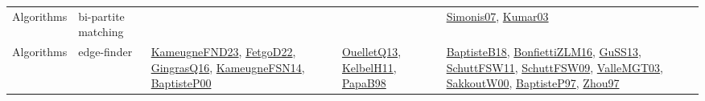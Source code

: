 {\begin{longtable}{lp{3cm}>{\raggedright}p{6cm}>{\raggedright}p{6cm}p{8cm}}
Algorithms & bi-partite matching &  &  & \href{articles/Simonis07.pdf}{Simonis07}\cite{Simonis07}, \href{papers/Kumar03.pdf}{Kumar03}\cite{Kumar03}\\
Algorithms & edge-finder & \href{papers/KameugneFND23.pdf}{KameugneFND23}\cite{KameugneFND23}, \href{articles/FetgoD22.pdf}{FetgoD22}\cite{FetgoD22}, \href{papers/GingrasQ16.pdf}{GingrasQ16}\cite{GingrasQ16}, \href{articles/KameugneFSN14.pdf}{KameugneFSN14}\cite{KameugneFSN14}, \href{articles/BaptisteP00.pdf}{BaptisteP00}\cite{BaptisteP00} & \href{papers/OuelletQ13.pdf}{OuelletQ13}\cite{OuelletQ13}, \href{articles/KelbelH11.pdf}{KelbelH11}\cite{KelbelH11}, \href{articles/PapaB98.pdf}{PapaB98}\cite{PapaB98} & \href{articles/BaptisteB18.pdf}{BaptisteB18}\cite{BaptisteB18}, \href{papers/BonfiettiZLM16.pdf}{BonfiettiZLM16}\cite{BonfiettiZLM16}, \href{papers/GuSS13.pdf}{GuSS13}\cite{GuSS13}, \href{articles/SchuttFSW11.pdf}{SchuttFSW11}\cite{SchuttFSW11}, \href{papers/SchuttFSW09.pdf}{SchuttFSW09}\cite{SchuttFSW09}, \href{papers/ValleMGT03.pdf}{ValleMGT03}\cite{ValleMGT03}, \href{articles/SakkoutW00.pdf}{SakkoutW00}\cite{SakkoutW00}, \href{papers/BaptisteP97.pdf}{BaptisteP97}\cite{BaptisteP97}, \href{articles/Zhou97.pdf}{Zhou97}\cite{Zhou97}\\

\end{longtable}}
